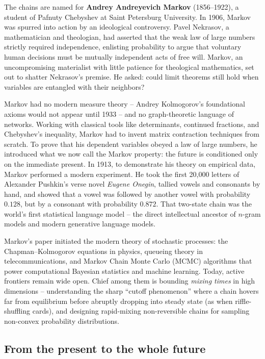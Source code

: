 \begin{historybox}
The chains are named for \textbf{Andrey Andreyevich Markov} (1856--1922), a student of
Pafnuty Chebyshev at Saint Petersburg University. In 1906, Markov was spurred into action by
an ideological controversy. Pavel Nekrasov, a mathematician and theologian, had asserted that
the weak law of large numbers strictly required independence, enlisting probability to argue
that voluntary human decisions must be mutually independent acts of free will. Markov, an
uncompromising materialist with little patience for theological mathematics, set out to
shatter Nekrasov's premise. He asked: could limit theorems still hold when variables are
entangled with their neighbors?

Markov had no modern measure theory -- Andrey Kolmogorov's foundational axioms would not appear
until 1933 -- and no graph-theoretic language of networks. Working with classical tools like
determinants, continued fractions, and Chebyshev's inequality, Markov had to invent matrix
contraction techniques from scratch. To prove that his dependent variables obeyed a law of
large numbers, he introduced what we now call the Markov property: the future is conditioned
only on the immediate present. In 1913, to demonstrate his theory on empirical data, Markov
performed a modern experiment. He took the first 20{,}000 letters of Alexander
Pushkin's verse novel \emph{Eugene Onegin}, tallied vowels and consonants by hand, and showed
that a vowel was followed by another vowel with probability $0.128$, but by a consonant with
probability $0.872$. That two-state chain was the world's first statistical language model --
the direct intellectual ancestor of $n$-gram models and modern generative language models.

Markov's paper initiated the modern theory of stochastic processes: the Chapman--Kolmogorov equations
in physics, queueing theory in telecommunications, and Markov Chain Monte Carlo (MCMC)
algorithms that power computational Bayesian statistics and machine learning. Today, active
frontiers remain wide open. Chief among them is bounding \emph{mixing times} in high
dimensions -- understanding the sharp ``cutoff phenomenon'' where a chain hovers far from
equilibrium before abruptly dropping into steady state (as when riffle-shuffling cards), and
designing rapid-mixing non-reversible chains for sampling non-convex probability distributions.
\end{historybox}

\subsection{From the present to the whole future}

